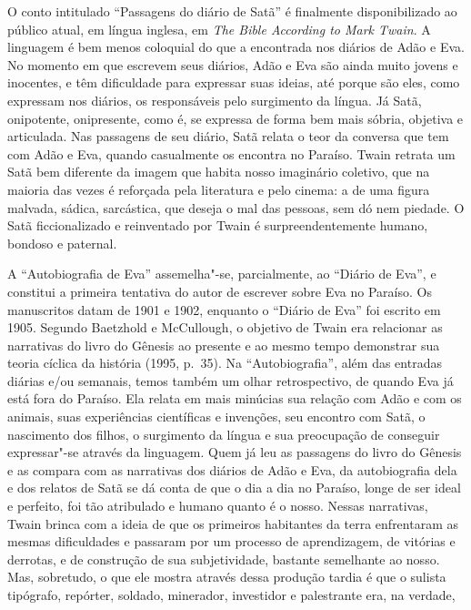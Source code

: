 O conto intitulado ``Passagens do diário de
Satã'' é finalmente disponibilizado ao público atual, em
língua inglesa, em \textit{The Bible According to Mark Twain}.
A linguagem é bem menos coloquial do que a encontrada nos diários de Adão e
Eva. No momento em que escrevem seus diários, Adão e Eva são ainda muito jovens e
inocentes, e têm dificuldade para expressar suas ideias, até porque são
eles, como expressam nos diários, os responsáveis pelo surgimento da
língua. Já Satã, onipotente, onipresente, como é, se
expressa de forma bem mais sóbria, objetiva e articulada. Nas passagens de
seu diário, Satã relata o teor da conversa que tem com Adão e Eva, quando
casualmente os encontra no Paraíso. Twain retrata um Satã bem
diferente da imagem que habita nosso imaginário coletivo, que na maioria
das vezes é reforçada pela literatura e pelo cinema: a de uma figura
malvada, sádica, sarcástica, que deseja o mal das pessoas, sem dó nem
piedade. O Satã ficcionalizado e reinventado por Twain é
surpreendentemente humano, bondoso e paternal.

A ``Autobiografia de Eva'' assemelha"-se,
parcialmente, ao ``Diário de Eva'', e
constitui a primeira tentativa do autor de escrever sobre Eva no
Paraíso. Os manuscritos datam de 1901 e 1902, enquanto o
``Diário de Eva'' foi escrito em 1905. Segundo
Baetzhold e McCullough, o objetivo de Twain era relacionar as narrativas do
livro do Gênesis ao presente e ao mesmo tempo demonstrar sua teoria
cíclica da história (1995, p.~35). Na “Autobiografia”, além das entradas
diárias e/ou semanais, temos também um olhar retrospectivo, de quando Eva
já está fora do Paraíso. Ela relata em mais minúcias sua relação com Adão
e com os animais, suas experiências científicas e invenções, seu encontro
com Satã, o nascimento dos filhos, o surgimento da língua e sua
preocupação de conseguir expressar"-se através da linguagem. Quem já leu as
passagens do livro do Gênesis e as compara com as narrativas dos diários
de Adão e Eva, da autobiografia dela e dos relatos de Satã se dá conta de que
o dia a dia no Paraíso, longe de ser ideal e perfeito, foi tão atribulado e
humano quanto é o nosso. Nessas narrativas, Twain brinca com a
ideia de que os primeiros habitantes da terra enfrentaram as mesmas
dificuldades e passaram por um processo de aprendizagem, de vitórias e
derrotas, e de construção de sua subjetividade, bastante semelhante ao
nosso. Mas, sobretudo, o que ele mostra através dessa produção tardia é
que o sulista tipógrafo, repórter, soldado, minerador, investidor e
palestrante era, na verdade,

